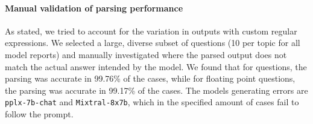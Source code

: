 \paragraph*{Manual validation of parsing performance}

As stated, we tried to account for the variation in outputs with custom regular expressions.
We selected a large, diverse subset of questions (10 per topic for all model reports) and manually investigated where the parsed output does not match the actual answer intended by the model.
We found that for  questions, the parsing was accurate in 99.76\% of the cases, while for floating point questions, the parsing was accurate in 99.17\% of the cases.
The models generating errors are \texttt{pplx-7b-chat} and \texttt{Mixtral-8x7b}, which in the specified amount of cases fail to follow the prompt.
